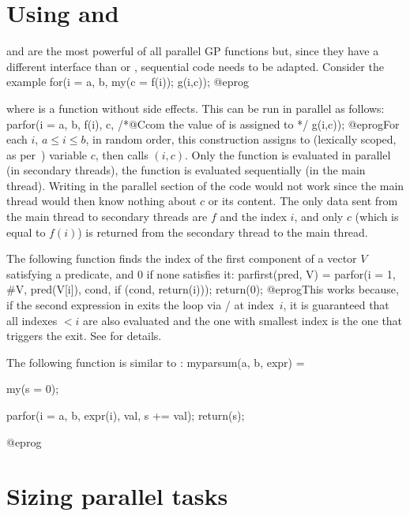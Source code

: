\section{Using  and }
 and  are the most powerful of all parallel GP
functions but, since they have a different interface than  or
, sequential code needs to be adapted. Consider the example
\bprog
for(i = a, b,
  my(c = f(i));
  g(i,c));
@eprog\noindent

where  is a function without side effects.  This can be run in parallel
as follows:
\bprog
parfor(i = a, b,
  f(i),
  c,     /*@Ccom the value of  is assigned to  */
  g(i,c));
@eprog\noindent For each $i$, $a \leq i \leq b$, in random order,
this construction assigns  to (lexically scoped, as per~)
variable $c$, then calls $(i,c)$. Only the function  is
evaluated in parallel (in secondary threads), the function  is
evaluated sequentially (in the main thread). Writing  in the
parallel section of the code would not work since the main thread would then
know nothing about $c$ or its content. The only data sent from the main
thread to secondary threads are $f$ and the index $i$, and only $c$ (which
is equal to $f(i)$) is returned from the secondary thread to the main thread.

The following function finds the index of the first component of a vector
$V$ satisfying a predicate, and $0$ if none satisfies it:
\bprog
parfirst(pred, V) =
{
  parfor(i = 1, #V,
    pred(V[i]),
    cond,
    if (cond, return(i)));
  return(0);
}
@eprog\noindent This works because, if the second expression
in  exits the loop via  /  at index~$i$,
it is guaranteed that all indexes $< i$ are also evaluated and the one with
smallest index is the one that triggers the exit. See  for
details.

The following function is similar to :
\bprog
myparsum(a, b, expr) =
{ my(s = 0);

  parfor(i = a, b,
    expr(i),
    val,
    s += val);
  return(s);
}
@eprog

\section{Sizing parallel tasks}

